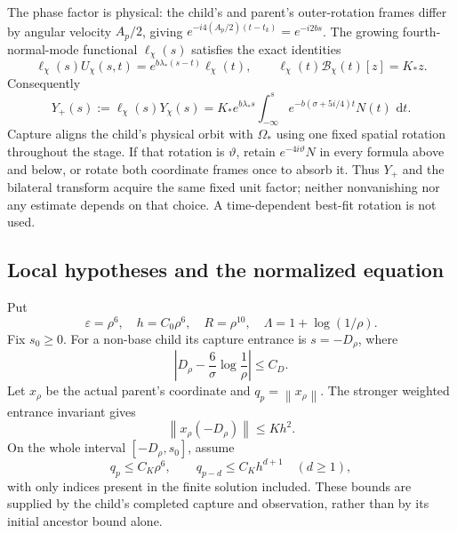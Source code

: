 \documentclass[11pt]{amsart}
\theoremstyle{remark}
\numberwithin{equation}{section}
\newcommand{\norm}[1]{\left\lVert#1\right\rVert}
\newcommand{\dd}{\,\mathrm d}
\begin{document}
The phase factor is physical: the child's and parent's outer-rotation
frames differ by angular velocity $A_p/2$, giving
$e^{-i4(A_p/2)(t-t_k)}=e^{-i2bs}$. The growing fourth-normal-mode
functional $\ell_\chi(s)$ satisfies the exact identities
\[
 \ell_\chi(s)U_\chi(s,t)
   =e^{b\lambda_*(s-t)}\ell_\chi(t),\qquad
 \ell_\chi(t)\mathcal B_\chi(t)[z]=K_*z.
\]
Consequently
\begin{equation}\label{re:eq:Yplus}
 Y_+(s):=\ell_\chi(s)Y_\chi(s)
 =K_*e^{b\lambda_*s}
       \int_{-\infty}^s e^{-b(\sigma+5i/4)t}N(t)\,\dd t.
\end{equation}
Capture aligns the child's physical orbit with $\Omega_*$ using one
fixed spatial rotation throughout the stage. If that rotation is
$\vartheta$, retain $e^{-4i\vartheta}N$ in every formula above and
below, or rotate both coordinate frames once to absorb it. Thus $Y_+$
and the bilateral transform acquire the same fixed unit factor; neither
nonvanishing nor any estimate depends on that choice. A time-dependent
best-fit rotation is not used.

\subsection{Local hypotheses and the normalized equation}
Put
\[
 \varepsilon=\rho^6,\quad h=C_0\rho^6,\quad
 R=\rho^{10},\quad \Lambda=1+\log(1/\rho).
\]
Fix $s_0\geq0$. For a non-base child its capture entrance is
$s=-D_\rho$, where
\begin{equation}\label{re:eq:history}
 \left|D_\rho-\frac6\sigma\log\frac1\rho\right|\leq C_D.
\end{equation}
Let $x_\rho$ be the actual parent's coordinate and $q_p=\norm{x_\rho}$.
The stronger weighted entrance invariant gives
\begin{equation}\label{re:eq:parentinitial}
 \norm{x_\rho(-D_\rho)}\leq Kh^2.
\end{equation}
On the whole interval $[-D_\rho,s_0]$, assume
\begin{equation}\label{re:eq:ancestorbounds}
 q_p\leq C_K\rho^6,\qquad
 q_{p-d}\leq C_Kh^{d+1}\quad(d\geq1),
\end{equation}
with only indices present in the finite solution included.
These bounds are supplied by the child's completed capture and
observation, rather than by its initial ancestor bound alone.
\end{document}
